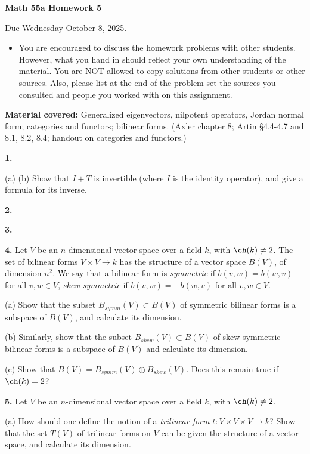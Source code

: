 \documentclass[11pt,letterpaper]{article}
\begin{document}
\begin{center}
{\bf \Large Math 55a Homework 5}\medskip

Due Wednesday October 8, 2025.
\end{center}

\begin{itemize}
\item You are encouraged to discuss the homework problems with 
other students. However, what you hand in should reflect your 
own understanding of the material. You are NOT allowed to copy solutions 
from other students or other sources. Also, please list at the end of the
problem set the sources you consulted and people you worked with on 
this assignment.
\end{itemize}

{\bf Material covered:} Generalized eigenvectors, nilpotent operators, Jordan normal form;
categories and functors; bilinear forms.
(Axler chapter 8; 
Artin \S 4.4-4.7 and 8.1, 8.2, 8.4; handout on categories and functors.)
\bigskip


{\bf 1.} 

(a)
(b) Show that $I+T$ is invertible (where $I$ is the identity operator),
and give a formula for its inverse.
\medskip


{\bf 2.}


{\bf 3.}\medskip

{\bf 4.} Let $V$ be an $n$-dimensional vector space over a field $k$,
with $\ch(k)\neq 2$.
The set of bilinear forms $V\times V\to k$ has the structure of a vector space $B(V)$,
of dimension $n^2$. We say that a bilinear form is {\em symmetric} if $b(v,w)=b(w,v)$ for
all $v,w\in V$, {\em skew-symmetric} if $b(v,w)=-b(w,v)$ for all
$v,w\in V$.

(a) Show that the subset $B_{symm}(V)\subset B(V)$ of symmetric bilinear
forms is a subspace of $B(V)$, and calculate its dimension.

(b) Similarly, show that the subset $B_{skew}(V)\subset B(V)$ of
skew-symmetric bilinear forms is a subspace of $B(V)$ and calculate its
dimension.

(c) Show that $B(V)=B_{symm}(V)\oplus B_{skew}(V)$. Does this remain true if
$\ch(k)=2$?
\medskip

{\bf 5.} Let $V$ be an $n$-dimensional vector space over a field $k$,
with $\ch(k)\neq 2$. 

(a) How should one define the notion of a {\em trilinear form} $t:V\times V\times V\to k$?
Show that the set $T(V)$ of trilinear forms on $V$ can be given the
structure of a vector space, and calculate its dimension.
\end{document}
